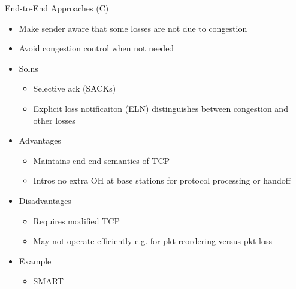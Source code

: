 \documentclass[a4paper]{article}
\begin{document}
End-to-End Approaches (C)
\begin{itemize}
	\item Make sender aware that some losses are not due to congestion
	\item Avoid congestion control when not needed
	\item Solns
	\begin{itemize}
		\item Selective ack (SACKs)
		\item Explicit loss notificaiton (ELN) distinguishes between
			congestion and other losses
	\end{itemize}
	\item Advantages
	\begin{itemize}
		\item Maintains end-end semantics of TCP
		\item Intros no extra OH at base stations for protocol
			processing or handoff
	\end{itemize}
	\item Disadvantages
	\begin{itemize}
		\item Requires modified TCP
		\item May not operate efficiently e.g. for pkt reordering versus
			pkt loss
	\end{itemize}
	\item Example
	\begin{itemize}
		\item SMART
	\end{itemize}
\end{itemize}
\end{document}
